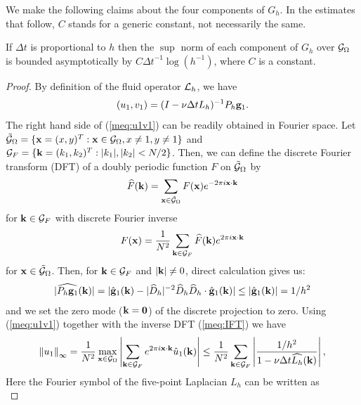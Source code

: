 We make the following claims about the four components of $G_h$. In the estimates that follow, $C$ stands for a generic
constant, not necessarily the same. 
\begin{lemma}
\label{lemma:gh}
If $\Delta t$ is proportional to $h$ then the $\sup$ norm of each component of $G_h$ over $\mathcal{G}_\Omega$ is bounded asymptotically by $C {\Delta t}^{-1}\log(h^{-1})$, where $C$ is a constant. 
\end{lemma}
\begin{proof}
By definition of the fluid operator $\mathcal{L}_h$, we have 
\begin{equation}
(u_1,v_1) = (I -\nu\Delta t L_h)^{-1}  P_h \mathbf{g}_1.\label{meq:u1v1}
\end{equation}
The right hand side of (\ref{meq:u1v1}) can be readily obtained in Fourier space.  Let 
$\tilde{\mathcal{G}}_\Omega =\{ \mathbf{x}=(x,y)^T : \mathbf{x} \in \mathcal{G}_\Omega, x \neq 1, y \neq 1\}$
and $\mathcal{G}_F =\{ \mathbf{k}=(k_1,k_2)^T :       |k_1|,|k_2| <N/2\}$. Then, we can define the 
 discrete Fourier transform (DFT) of a doubly periodic function $F$  on $\tilde{\mathcal{G}}_\Omega$ by
\begin{align}
\widehat{F}(\mathbf{k}) =  \sum_{\mathbf{x} \in \tilde{\mathcal{G}}_\Omega} F(\mathbf{x}) e^{-2\pi i \mathbf{x}\cdot \mathbf{k}}
\end{align}
for $\mathbf{k} \in \mathcal{G}_F$ with discrete Fourier inverse
\begin{align}
F(\mathbf{x}) =\frac{1}{N^2} \sum_{\mathbf{k} \in \mathcal{G}_F} \widehat{F}(\mathbf{k}) e^{2 \pi i \mathbf{x}\cdot \mathbf{k}}
\label{meq:IFT}
\end{align}
for $\mathbf{x} \in \tilde{\mathcal{G}}_\Omega $. Then, for $\mathbf{k} \in \mathcal{G}_F$  and $|\mathbf{k}| \ne 0$, 
direct calculation gives us:
\begin{align}
|\widehat{P_h \mathbf{g}_1}(\mathbf{k})| = |\hat{\mathbf{g}}_1(\mathbf{k})-|\widehat{D}_h|^{-2}\widehat{D}_h\widehat{D}_h\cdot\hat{\mathbf{g}}_1(\mathbf{k})| \leq |\hat{\mathbf{g}}_1(\mathbf{k})| = 1/h^2
\end{align}
and we set  the zero mode ($\mathbf{k}=\mathbf{0}$) of the discrete projection to zero. 
Using (\ref{meq:u1v1}) together with the inverse DFT (\ref{meq:IFT}) we have
\begin{equation}
\left\lVert u_1\right\rVert_\infty =
\frac{1}{N^2}\max_{\mathbf{x}\in\mathcal{G}_\Omega}
\left|\sum_{\mathbf{k}\in\mathcal{G}_F}
e^{2\pi i\mathbf{x}\cdot\mathbf{k}}
\hat{u}_1(\mathbf{k})\right|
\leq
\frac{1}{N^2}\sum_{\mathbf{k}\in\mathcal{G}_F}
\left|\frac{1/h^2}
{1-\nu\Delta t \widehat{L_h}(\mathbf{k})}\right|,
\end{equation}
Here the Fourier symbol of the five-point Laplacian $L_h$ can be written as
\begin{equation}

\end{equation}
\end{proof}
